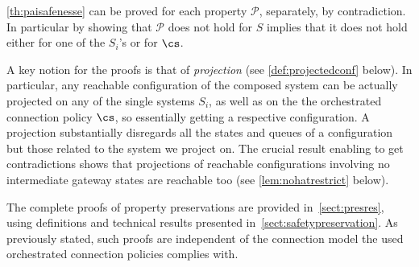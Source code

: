  \cref{th:paisafenesse} can be proved for each property $\mathcal{P}$, separately, by contradiction. 
 In particular by showing that $\mathcal{P}$ does not hold for $S$ implies that it does not hold either for one of the $S_i$'s or for $\cs$. 
 
 A key notion for the proofs is that of {\em  projection\/} (see \cref{def:projectedconf} below). 
 In particular, any reachable configuration of the composed system can be actually projected on
 any of the single systems $S_i$, as well as on the the orchestrated connection policy $\cs$,
so essentially getting a respective configuration. 
A projection substantially disregards all the states and queues
of a configuration but those related to the system we project on. 
The crucial result enabling to get contradictions
shows that projections of reachable configurations involving no
intermediate gateway states are reachable too (see \cref{lem:nohatrestrict} below).


The complete proofs of property preservations are provided  in~\cref{sect:presres},
using definitions and technical results presented in~\cref{sect:safetypreservation}. 
As previously stated, such proofs are independent of the connection model the used orchestrated connection policies complies with. 

 
%

